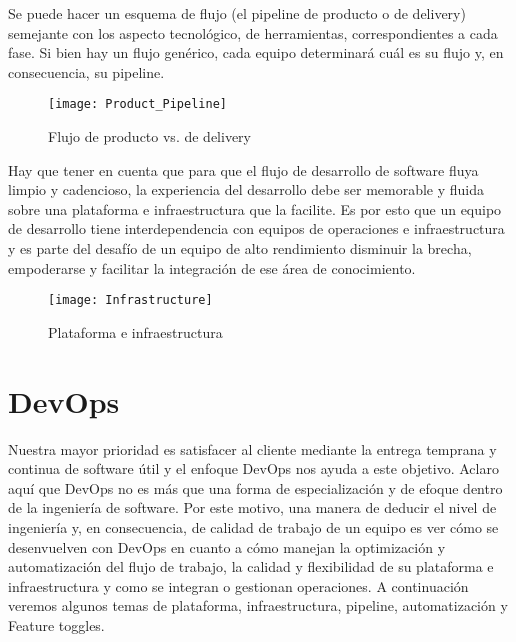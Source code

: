 Se puede hacer un esquema de flujo (el pipeline de producto o de delivery) semejante con los aspecto tecnológico, de herramientas, correspondientes a cada fase. Si bien hay un flujo genérico, cada equipo determinará cuál es su flujo y, en consecuencia, su pipeline.

\begin{figure}[h]
  \centering
  \texttt{[image: Product\_Pipeline]}
  \caption{Flujo de producto vs. de delivery}
  \centering
  \label{fig:Product_Pipeline} %
\end{figure}
\FloatBarrier %


Hay que tener en cuenta que para que el flujo de desarrollo de software fluya limpio y cadencioso, la experiencia del desarrollo debe ser memorable y fluida sobre una plataforma e infraestructura que la facilite. Es por esto que un equipo de desarrollo tiene interdependencia con equipos de operaciones e infraestructura y es parte del desafío de un equipo de alto rendimiento disminuir la brecha, empoderarse y facilitar la integración de ese área de conocimiento.

\begin{figure}[h]
  \centering
  \texttt{[image: Infrastructure]}
  \caption{Plataforma e infraestructura}
  \centering
  \label{fig:Infrastructure} %
\end{figure}
\FloatBarrier %


\section{DevOps}

Nuestra mayor prioridad es satisfacer al cliente mediante la entrega temprana y continua de software útil y el enfoque DevOps nos ayuda a este objetivo. Aclaro aquí que DevOps no es más que una forma de especialización y de efoque dentro de la ingeniería de software. Por este motivo, una manera de deducir el nivel de ingeniería y, en consecuencia, de calidad de trabajo de un equipo es ver cómo se desenvuelven con DevOps en cuanto a cómo manejan la optimización y automatización del flujo de trabajo, la calidad y flexibilidad de su plataforma e infraestructura y como se integran o gestionan operaciones. A continuación veremos algunos temas de plataforma, infraestructura, pipeline, automatización y Feature toggles.


